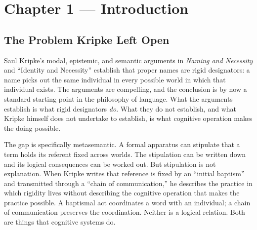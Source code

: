 \documentclass[12pt,a4paper]{article}
\begin{document}
\pagestyle{plain}

\section{Chapter 1 --- Introduction}\label{chapter-1-introduction}

\subsection{The Problem Kripke Left Open}\label{the-problem-kripke-left-open}

Saul Kripke's modal, epistemic, and semantic arguments in \emph{Naming and Necessity} and ``Identity and Necessity'' establish that proper names are rigid designators: a name picks out the same individual in every possible world in which that individual exists. The arguments are compelling, and the conclusion is by now a standard starting point in the philosophy of language. What the arguments establish is what rigid designators \emph{do}. What they do not establish, and what Kripke himself does not undertake to establish, is what cognitive operation makes the doing possible.

The gap is specifically metasemantic. A formal apparatus can stipulate that a term holds its referent fixed across worlds. The stipulation can be written down and its logical consequences can be worked out. But stipulation is not explanation. When Kripke writes that reference is fixed by an ``initial baptism'' and transmitted through a ``chain of communication,'' he describes the practice in which rigidity lives without describing the cognitive operation that makes the practice possible. A baptismal act coordinates a word with an individual; a chain of communication preserves the coordination. Neither is a logical relation. Both are things that cognitive systems do.
\end{document}
